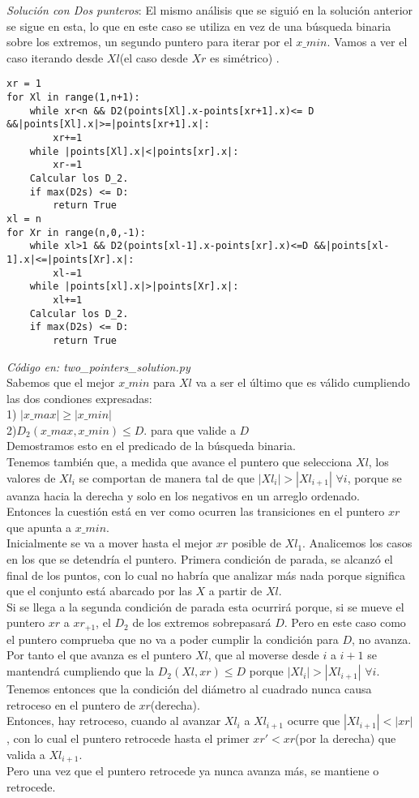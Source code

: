\documentclass{article}
\begin{document}
\textit{Soluci\'on con Dos punteros}: El mismo an\'alisis que se sigui\'o en la soluci\'on anterior se sigue en esta, lo que en este caso se utiliza en vez de una b\'usqueda binaria sobre los extremos, un segundo puntero para iterar por el $x\_min$. Vamos a ver el caso iterando desde $Xl$(el caso desde $Xr$ es sim\'etrico) .\\
\begin{verbatim}
xr = 1
for Xl in range(1,n+1):
    while xr<n && D2(points[Xl].x-points[xr+1].x)<= D &&|points[Xl].x|>=|points[xr+1].x|:
        xr+=1
    while |points[Xl].x|<|points[xr].x|:
        xr-=1
    Calcular los D_2.
    if max(D2s) <= D:
        return True
xl = n
for Xr in range(n,0,-1):
    while xl>1 && D2(points[xl-1].x-points[xr].x)<=D &&|points[xl-1].x|<=|points[Xr].x|:
        xl-=1
    while |points[xl].x|>|points[Xr].x|:
        xl+=1
    Calcular los D_2.
    if max(D2s) <= D:
        return True
\end{verbatim}
\textit{C\'odigo en: two\_pointers\_solution.py}\\

Sabemos que el mejor $x\_min$ para $Xl$ va a ser el \'ultimo que es v\'alido cumpliendo las dos condiones expresadas:\\
1) $|x\_max|\geq|x\_min|$ \\
2)$D_2(x\_max,x\_min)\leq D$. para que valide a $D$\\ 
Demostramos esto en el predicado de la b\'usqueda binaria.\\
Tenemos tambi\'en que, a medida que avance el puntero que selecciona $Xl$, los valores de $Xl_i$ se comportan de manera tal de que $|Xl_i|>|Xl_{i+1}|$ $\forall i$, porque se avanza hacia la derecha y solo en los negativos en un arreglo ordenado. \\
Entonces la cuesti\'on est\'a en ver como ocurren las transiciones en el puntero $xr$ que apunta a $x\_min$.\\
 Inicialmente se va a mover hasta el mejor $xr$ posible de $Xl_1$. Analicemos los casos en los que se detendr\'ia el puntero. 
 Primera condici\'on de parada, se alcanz\'o el final de los puntos, con lo cual no habr\'ia que analizar m\'as nada porque significa que el conjunto est\'a abarcado por las $X$ a partir de $Xl$.\\
 Si se llega a la segunda condici\'on de parada esta ocurrir\'a porque, si se mueve el puntero $xr$ a $xr_{+1}$, el $D_2$ de los extremos sobrepasar\'a $D$. Pero en este caso como el puntero comprueba que no va a poder cumplir la condici\'on para $D$, no avanza. Por tanto el que avanza es el puntero $Xl$, que al moverse desde $i$ a $i+1$ se mantendr\'a cumpliendo que la $D_2(Xl,xr)\leq D$ porque $|Xl_i|>|Xl_{i+1}|$ $\forall i$. Tenemos entonces que la condici\'on del di\'ametro al cuadrado nunca causa retroceso en el puntero de $xr$(derecha).\\
 Entonces, hay retroceso, cuando al avanzar  $Xl_i$ a $Xl_{i+1}$  ocurre que $|Xl_{i+1}|<|xr|$, con lo cual el puntero retrocede hasta el primer $xr'<xr$(por la derecha) que valida a $Xl_{i+1}$.  \\
 Pero una vez que el puntero retrocede ya nunca avanza m\'as, se mantiene o retrocede.\\
 
\end{document}
